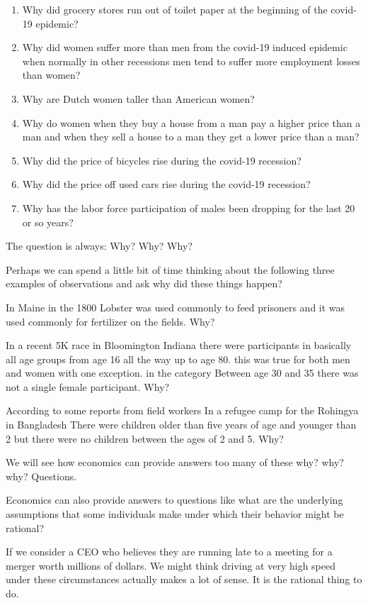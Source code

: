\documentclass[
]{book}
\providecommand{\tightlist}{%
  \setlength{\itemsep}{0pt}\setlength{\parskip}{0pt}}
\begin{document}
\begin{enumerate}
\def\labelenumi{\arabic{enumi}.}
\tightlist
\item
  Why did grocery stores run out of toilet paper at the beginning of the covid-19 epidemic?
\item
  Why did women suffer more than men from the covid-19 induced epidemic when normally in other recessions men tend to suffer more employment losses than women?\\
\item
  Why are Dutch women taller than American women?
\item
  Why do women when they buy a house from a man pay a higher price than a man and when they sell a house to a man they get a lower price than a man?
\item
  Why did the price of bicycles rise during the covid-19 recession?
\item
  Why did the price off used cars rise during the covid-19 recession?
\item
  Why has the labor force participation of males been dropping for the last 20 or so years?
\end{enumerate}

The question is always:
Why? Why? Why?

Perhaps we can spend a little bit of time thinking about the following three examples of observations and ask why did these things happen?

In Maine in the 1800 Lobster was used commonly to feed prisoners and it was used commonly for fertilizer on the fields. Why?

In a recent 5K race in Bloomington Indiana there were participants in basically all age groups from age 16 all the way up to age 80. this was true for both men and women with one exception. in the category Between age 30 and 35 there was not a single female participant. Why?

According to some reports from field workers In a refugee camp for the Rohingya in Bangladesh There were children older than five years of age and younger than 2 but there were no children between the ages of 2 and 5. Why?

We will see how economics can provide answers too many of these why? why? why? Questions.

Economics can also provide answers to questions like what are the underlying assumptions that some individuals make under which their behavior might be rational?

If we consider a CEO who believes they are running late to a meeting for a merger worth millions of dollars. We might think driving at very high speed under these circumstances actually makes a lot of sense. It is the rational thing to do.
\end{document}

